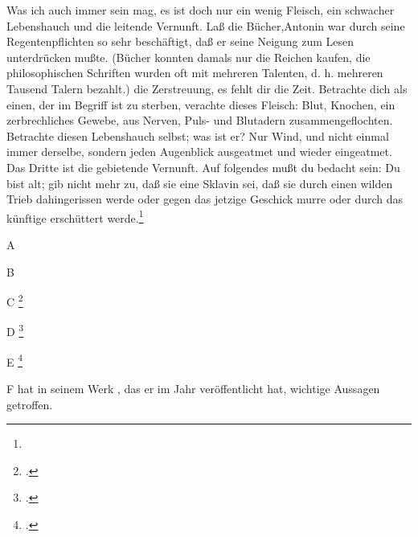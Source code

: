 \documentclass[12pt,ngerman,parskip=half]{scrartcl}
\begin{document}
\blindtext

\cite{Duck2000}

Was ich auch immer sein mag, es ist doch nur ein wenig Fleisch, ein schwacher Lebenshauch und die leitende Vernunft. Laß die Bücher,Antonin war durch seine Regentenpflichten so sehr beschäftigt, daß er seine Neigung zum Lesen unterdrücken mußte. (Bücher konnten damals nur die Reichen kaufen, die philosophischen Schriften wurden oft mit mehreren Talenten, d. h. mehreren Tausend Talern bezahlt.) die Zerstreuung, es fehlt dir die Zeit. Betrachte dich als einen, der im Begriff ist zu sterben, verachte dieses Fleisch: Blut, Knochen, ein zerbrechliches Gewebe, aus Nerven, Puls- und Blutadern zusammengeflochten. Betrachte diesen Lebenshauch selbst; was ist er? Nur Wind, und nicht einmal immer derselbe, sondern jeden Augenblick ausgeatmet und wieder eingeatmet. Das Dritte ist die gebietende Vernunft. Auf folgendes mußt du bedacht sein: Du bist alt; gib nicht mehr zu, daß sie eine Sklavin sei, daß sie durch einen wilden Trieb dahingerissen werde oder gegen das jetzige Geschick murre oder durch das künftige erschüttert werde.\footnote{\blindtext}

A \cite{Chen2018}

\clearpage

B \parencite{Chen2018}

C \blindtext\footcite{Chen2018} 

D \footcite{Duck2000}

E \blindtext\footcite{Chen2018}

F \citeauthor{Knuth1984} hat in seinem Werk  , das er im Jahr  \citeyear{Knuth1984} veröffentlicht hat, wichtige Aussagen getroffen.

\printbibliography[title={Artikel},type=article]

\printbibliography[title={Bücher},type=book]
\end{document}
